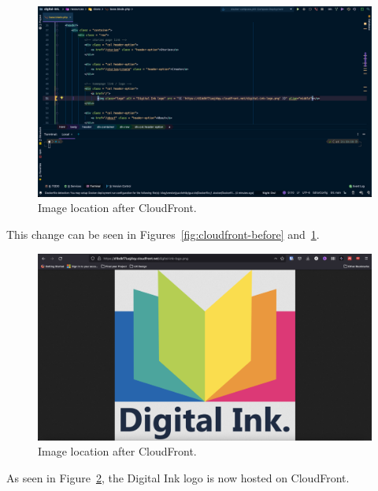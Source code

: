 \begin{figure}[!htbp]
    \centering
    \includegraphics[width=\textwidth]{resources/cloudfront/cloudfront-after}
    \caption{Image location after CloudFront.}
    \label{fig:cloudfront-after}
\end{figure}

This change can be seen in Figures~\ref{fig:cloudfront-before} and~\ref{fig:cloudfront-after}.

\begin{figure}[!htbp]
    \centering
    \includegraphics[width=\textwidth]{resources/cloudfront/cloudfront-website}
    \caption{Image location after CloudFront.}
    \label{fig:cloudfront-website}
\end{figure}

As seen in Figure~\ref{fig:cloudfront-website}, the Digital Ink logo is now hosted on CloudFront.





